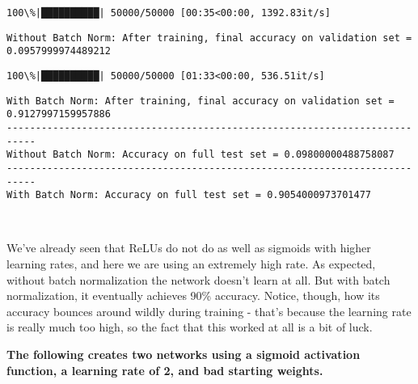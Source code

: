 \documentclass[11pt]{article}
\begin{document}
    \begin{Verbatim}[commandchars=\\\{\}]
100\%|██████████| 50000/50000 [00:35<00:00, 1392.83it/s]

    \end{Verbatim}

    \begin{Verbatim}[commandchars=\\\{\}]
Without Batch Norm: After training, final accuracy on validation set = 0.0957999974489212

    \end{Verbatim}

    \begin{Verbatim}[commandchars=\\\{\}]
100\%|██████████| 50000/50000 [01:33<00:00, 536.51it/s]

    \end{Verbatim}

    \begin{Verbatim}[commandchars=\\\{\}]
With Batch Norm: After training, final accuracy on validation set = 0.9127997159957886
---------------------------------------------------------------------------
Without Batch Norm: Accuracy on full test set = 0.09800000488758087
---------------------------------------------------------------------------
With Batch Norm: Accuracy on full test set = 0.9054000973701477

    \end{Verbatim}

    \begin{center}
    \end{center}
    { \hspace*{\fill} \\}
    
    We've already seen that ReLUs do not do as well as sigmoids with higher
learning rates, and here we are using an extremely high rate. As
expected, without batch normalization the network doesn't learn at all.
But with batch normalization, it eventually achieves 90\% accuracy.
Notice, though, how its accuracy bounces around wildly during training -
that's because the learning rate is really much too high, so the fact
that this worked at all is a bit of luck.

    \textbf{The following creates two networks using a sigmoid activation
function, a learning rate of 2, and bad starting weights.}
\end{document}
